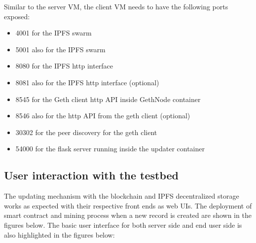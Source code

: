 \documentclass{article}
\begin{document}
Similar to the server VM, the client VM needs to have the following ports exposed:
\begin{itemize}
    \item 4001 for the IPFS swarm
    \item 5001 also for the IPFS swarm
    \item 8080 for the IPFS http interface
    \item 8081 also for the IPFS http interface (optional)
    \item 8545 for the Geth client http API inside GethNode container
    \item 8546 also for the http API from the geth client (optional)
    \item 30302 for the peer discovery for the geth client
    \item 54000 for the flask server running inside the updater container 
\end{itemize}

\newpage
\subsection{User interaction with the testbed}
The updating mechanism with the blockchain and IPFS decentralized storage works as expected with their respective front ends as web UIs. The deployment of smart contract and mining process when a new record is created are shown in the figures below. The basic user interface for both server side and end user side is also highlighted in the figures below:
\end{document}
